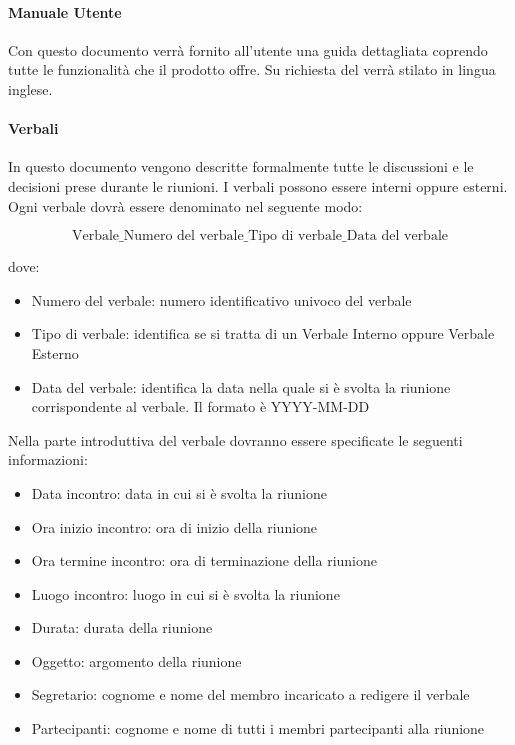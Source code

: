 \paragraph{Manuale Utente  }
Con questo documento verrà fornito all'utente una guida dettagliata coprendo tutte le funzionalità che il prodotto offre.
Su richiesta del  verrà stilato in lingua inglese.


\paragraph{Verbali }
In questo documento vengono descritte formalmente tutte le discussioni
e le decisioni prese durante le riunioni. I verbali possono essere
interni oppure esterni. 
Ogni verbale dovrà essere denominato nel seguente modo: 


$$\text{Verbale}\_\text{Numero del verbale}\_\text{Tipo di verbale}\_\text{Data del verbale} $$

dove:
\begin{itemize}
\item Numero del verbale: numero identificativo univoco del verbale
\item Tipo di verbale: identifica se si tratta di un Verbale Interno oppure Verbale Esterno
\item Data del verbale: identifica la data nella quale si è svolta la riunione corrispondente al verbale. Il formato è YYYY-MM-DD  
\end{itemize}


Nella parte introduttiva del verbale dovranno essere specificate le
seguenti informazioni:
\begin{itemize}
\item Data incontro:  data in cui si è svolta la riunione
\item Ora inizio incontro: ora di inizio della riunione
\item Ora termine incontro: ora di terminazione della riunione
\item Luogo incontro: luogo in cui si è svolta la riunione
\item Durata: durata della riunione
\item Oggetto: argomento della riunione
\item Segretario: cognome e nome del membro incaricato a redigere il verbale
\item Partecipanti: cognome e nome di tutti i membri partecipanti alla
  riunione
\end{itemize}

